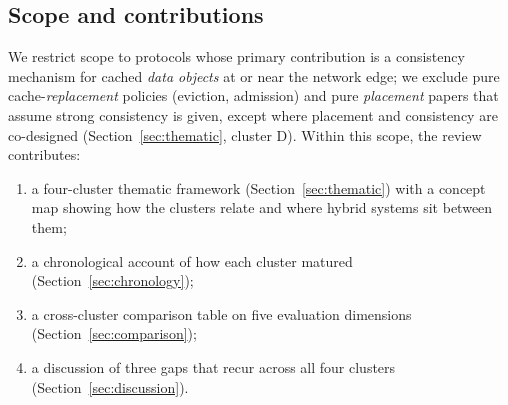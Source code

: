 \subsection{Scope and contributions}

We restrict scope to protocols whose primary contribution is a consistency mechanism for cached
\emph{data objects} at or near the network edge; we exclude pure cache-\emph{replacement} policies
(eviction, admission) and pure \emph{placement} papers that assume strong consistency is given, except
where placement and consistency are co-designed (Section~\ref{sec:thematic}, cluster D). Within this
scope, the review contributes:

\begin{enumerate}
  \item a four-cluster thematic framework (Section~\ref{sec:thematic}) with a concept map showing how
        the clusters relate and where hybrid systems sit between them;
  \item a chronological account of how each cluster matured (Section~\ref{sec:chronology});
  \item a cross-cluster comparison table on five evaluation dimensions
        (Section~\ref{sec:comparison});
  \item a discussion of three gaps that recur across all four clusters (Section~\ref{sec:discussion}).
\end{enumerate}
